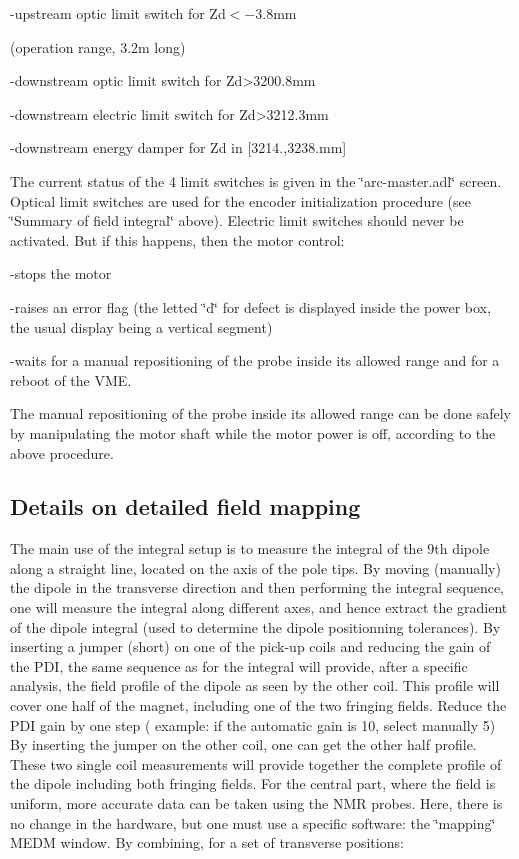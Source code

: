 -upstream optic limit switch for Zd$<-$3.8mm 

(operation range, 3.2m long) 

-downstream optic limit switch for Zd>3200.8mm 

-downstream electric limit switch for Zd>3212.3mm 

-downstream energy damper for Zd in {[}3214.,3238.mm{]} 

The current status of the 4 limit switches is given in the \char`\"{}arc-master.adl\char`\"{}
screen. Optical limit switches are used for the encoder initialization procedure
(see \char`\"{}Summary of field integral\char`\"{} above). Electric limit switches
should never be activated. But if this happens, then the motor control: 

-stops the motor 

-raises an error flag (the letted \char`\"{}d\char`\"{} for defect is displayed
inside the power box, the usual display being a vertical segment) 

-waits for a manual repositioning of the probe inside its allowed range and
for a reboot of the VME. 

The manual repositioning of the probe inside its allowed range can be done safely
by manipulating the motor shaft while the motor power is off, according to the
above procedure. 


\subsection{Details on detailed field mapping }

The main use of the integral setup is to measure the integral of the 9th dipole
along a straight line, located on the axis of the pole tips. By moving (manually)
the dipole in the transverse direction and then performing the integral sequence,
one will measure the integral along different axes, and hence
extract the gradient of the dipole integral (used to determine the dipole positionning tolerances).
By inserting a jumper (short) on one of the pick-up coils and reducing the gain
of the PDI, the same sequence as for the integral will provide, after a specific
analysis, the field profile of the dipole as seen by the other coil. This profile
will cover one half of the magnet, including one of the two fringing fields.
Reduce the PDI gain by one step ( example: if the automatic gain is 10, select
manually 5) By inserting the jumper on the other coil, one can get the other
half profile. These two single coil measurements will provide together the complete
profile of the dipole including both fringing fields. For the central part,
where the field is uniform, more accurate data can be taken using the NMR probes.
Here, there is no change in the hardware, but one must use a specific software:
the \char`\"{}mapping\char`\"{} MEDM window. By combining, for a set of transverse
positions: 

